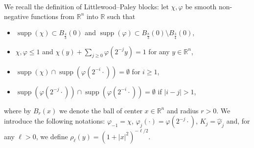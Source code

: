 \documentclass{article}
\newcommand{\tmop}[1]{\ensuremath{\operatorname{#1}}}
\begin{document}
We recall the definition of Littlewood--Paley blocks: let $\chi, \varphi$ be
smooth non-negative functions from $\mathbb{R}^n$ into $\mathbb{R}$ such that
\begin{itemize}
  \item $\tmop{supp} (\chi) \subset B_{\frac{4}{3}} (0)$ and $\tmop{supp}
  (\varphi) \subset B_{\frac{8}{3}} (0) \setminus B_{\frac{3}{4}} (0)$,
  
  \item $\chi, \varphi \leq 1$ and $\chi (y) + \sum_{j \geq 0} \varphi (2^{-
  j} y) = 1$ for any $y \in \mathbb{R}^n$,
  
  \item $\tmop{supp} (\chi) \cap \tmop{supp} (\varphi (2^{- i} \cdot)) =
  \emptyset$ for $i \geqslant 1$,
  
  \item $\tmop{supp} (\varphi (2^{- j} \cdot)) \cap \tmop{supp} (\varphi (2^{-
  i} \cdot)) = \emptyset$ if $| i - j | > 1$,
\end{itemize}
where by $B_r (x)$ we denote the ball of center $x \in \mathbb{R}^n$ and
radius $r > 0$. We introduce the following notations: $\varphi_{- 1} = \chi$,
$\varphi_j (\cdot) = \varphi (2^{- j} \cdot)$, $K_j = \hat{\varphi}_j$ and,
for any $\ell > 0$, we define $\rho_{\ell} (y) = (1 + | x |^2)^{- \ell / 2}$.

\
\end{document}
